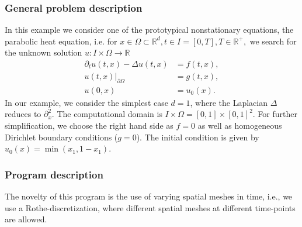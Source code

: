 \subsubsection{General problem description}

In this example we consider one of the prototypical nonstationary equations, the parabolic heat equation, i.e. for $x \in \Omega \subset \mathbb{R}^d, t\in I =[0,T], T\in \mathbb{R}^+,$ we search for the unknown solution $u:I \times \Omega \rightarrow \mathbb{R}$
\begin{align*}
\partial_t u(t,x) - \Delta u(t,x) &= f(t,x),\\
u(t,x)|_{\partial \Omega} &= g(t,x),\\
u(0,x) &= u_0(x).
\end{align*} In our example, we consider the simplest case $d=1$, where the Laplacian $\Delta$ reduces to $\partial_x^2$. The computational domain is $ I\times \Omega = [0,1] \times [0,1]^2$. For further simplification, we choose the right hand side as $f=0$ as well as homogeneous Dirichlet boundary conditions ($g=0$). The initial condition is given by $u_0(x) = \min(x_1,1-x_1)$.

\subsubsection{Program description}
The novelty of this program is the use of varying spatial meshes in
time, i.e., we use a  Rothe-discretization,
where different spatial meshes at different time-points are allowed.

